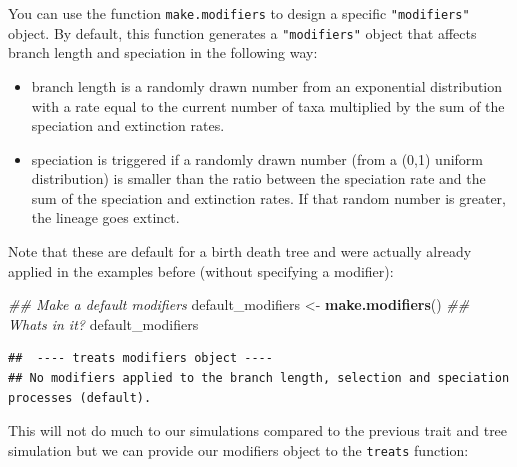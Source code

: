\documentclass[
]{book}
\newenvironment{Shaded}{\begin{snugshade}}{\end{snugshade}}
\newcommand{\CommentTok}[1]{\textcolor[rgb]{0.56,0.35,0.01}{\textit{#1}}}
\newcommand{\KeywordTok}[1]{\textcolor[rgb]{0.13,0.29,0.53}{\textbf{#1}}}
\newcommand{\NormalTok}[1]{#1}
\newcommand{\StringTok}[1]{\textcolor[rgb]{0.31,0.60,0.02}{#1}}
\providecommand{\tightlist}{%
  \setlength{\itemsep}{0pt}\setlength{\parskip}{0pt}}
\begin{document}
You can use the function \texttt{make.modifiers} to design a specific \texttt{"modifiers"} object.
By default, this function generates a \texttt{"modifiers"} object that affects branch length and speciation in the following way:

\begin{itemize}
\tightlist
\item
  branch length is a randomly drawn number from an exponential distribution with a rate equal to the current number of taxa multiplied by the sum of the speciation and extinction rates.
\item
  speciation is triggered if a randomly drawn number (from a (0,1) uniform distribution) is smaller than the ratio between the speciation rate and the sum of the speciation and extinction rates. If that random number is greater, the lineage goes extinct.
\end{itemize}

Note that these are default for a birth death tree and were actually already applied in the examples before (without specifying a modifier):

\begin{Shaded}
\begin{Highlighting}[]
\CommentTok{\#\# Make a default modifiers}
\NormalTok{default\_modifiers \textless{}{-}}\StringTok{ }\KeywordTok{make.modifiers}\NormalTok{()}
\CommentTok{\#\# What\textquotesingle{}s in it?}
\NormalTok{default\_modifiers}
\end{Highlighting}
\end{Shaded}

\begin{verbatim}
##  ---- treats modifiers object ---- 
## No modifiers applied to the branch length, selection and speciation processes (default).
\end{verbatim}

This will not do much to our simulations compared to the previous trait and tree simulation but we can provide our modifiers object to the \texttt{treats} function:
\end{document}
